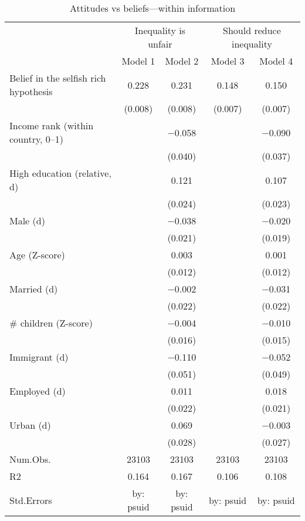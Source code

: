 \begin{table}

\caption{\label{tab:unnamed-chunk-67}Attitudes vs beliefs---within information}
\centering
\begin{tabular}[t]{lcccc}
\toprule
\multicolumn{1}{c}{ } & \multicolumn{2}{c}{Inequality is unfair} & \multicolumn{2}{c}{Should reduce inequality} \\
\cmidrule(l{3pt}r{3pt}){2-3} \cmidrule(l{3pt}r{3pt}){4-5}
  & Model 1 & Model 2 & Model 3 & Model 4\\
\midrule
Belief in the selfish rich hypothesis & \num{0.228} & \num{0.231} & \num{0.148} & \num{0.150}\\
 & (\num{0.008}) & (\num{0.008}) & (\num{0.007}) & (\num{0.007})\\
Income rank (within country, 0--1) &  & \num{-0.058} &  & \num{-0.090}\\
 &  & (\num{0.040}) &  & (\num{0.037})\\
High education (relative, d) &  & \num{0.121} &  & \num{0.107}\\
 &  & (\num{0.024}) &  & (\num{0.023})\\
Male (d) &  & \num{-0.038} &  & \num{-0.020}\\
 &  & (\num{0.021}) &  & (\num{0.019})\\
Age (Z-score) &  & \num{0.003} &  & \num{0.001}\\
 &  & (\num{0.012}) &  & (\num{0.012})\\
Married (d) &  & \num{-0.002} &  & \num{-0.031}\\
 &  & (\num{0.022}) &  & (\num{0.022})\\
\# children (Z-score) &  & \num{-0.004} &  & \num{-0.010}\\
 &  & (\num{0.016}) &  & (\num{0.015})\\
Immigrant (d) &  & \num{-0.110} &  & \num{-0.052}\\
 &  & (\num{0.051}) &  & (\num{0.049})\\
Employed (d) &  & \num{0.011} &  & \num{0.018}\\
 &  & (\num{0.022}) &  & (\num{0.021})\\
Urban (d) &  & \num{0.069} &  & \num{-0.003}\\
 &  & (\num{0.028}) &  & (\num{0.027})\\
\midrule
Num.Obs. & \num{23103} & \num{23103} & \num{23103} & \num{23103}\\
R2 & \num{0.164} & \num{0.167} & \num{0.106} & \num{0.108}\\
Std.Errors & by: psuid & by: psuid & by: psuid & by: psuid\\
\bottomrule
\end{tabular}
\end{table}